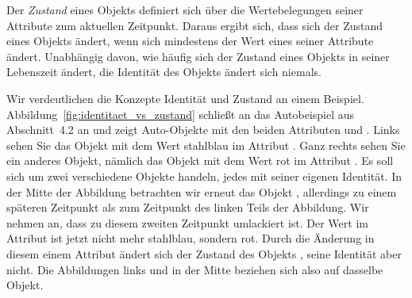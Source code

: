 
\clearpage %

Der \textit{Zustand} eines Objekts definiert sich über die Wertebelegungen seiner Attribute zum aktuellen Zeitpunkt. Daraus ergibt sich, dass sich der Zustand eines Objekts ändert, wenn sich mindestens der Wert eines seiner Attribute ändert. Unabhängig davon, wie häufig sich der Zustand eines Objekts in seiner Lebenszeit ändert, die Identität des Objekts ändert sich niemals. 

\vspace{2mm} %

Wir 
verdeutlichen die Konzepte Identität und Zustand an einem Beispiel. Abbildung~\ref{fig:identitaet_vs_zustand} schließt an das Autobeispiel aus Abschnitt~4.2 an und zeigt Auto-Objekte mit den beiden Attributen  und . Links sehen Sie das Objekt 
\linebreak %
 mit dem Wert stahlblau im Attribut . Ganz rechts sehen Sie ein anderes Objekt, nämlich das Objekt  mit dem Wert rot im Attribut . Es soll sich um zwei verschiedene Objekte handeln, jedes mit seiner eigenen Identität. In der Mitte der Abbildung betrachten wir erneut das Objekt , allerdings zu einem späteren Zeitpunkt als zum Zeitpunkt des linken Teils der Abbildung. Wir nehmen an, dass  zu diesem zweiten Zeitpunkt umlackiert ist. Der Wert im Attribut  ist jetzt nicht mehr stahlblau, sondern rot. Durch die Änderung in diesem einem Attribut ändert sich der Zustand des Objekts , seine Identität aber nicht. Die Abbildungen links und in der Mitte beziehen sich also auf dasselbe Objekt.

